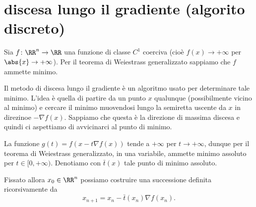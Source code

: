 \section{discesa lungo il gradiente (algorito discreto)}

Sia $f\colon \RR^n\to \RR$ una funzione di classe $C^1$
coerciva (cioè $f(x)\to +\infty$ per $\abs{x}\to +\infty$).
Per il teorema di Weiestrass generalizzato sappiamo che 
$f$ ammette minimo.

Il metodo di discesa lungo il gradiente è un algoritmo
usato per determinare tale minimo. 
L'idea è quella di partire da un punto $x$ qualunque
(possibilmente vicino al minimo) e cercare il minimo
muovendosi lungo la semiretta uscente da $x$ in direzinoe 
$-\nabla f(x)$. 
Sappiamo che questa è la direzione di massima discesa 
e quindi ci aspettiamo di avvicinarci al punto di minimo.

La funzione $g(t) = f(x-t\nabla f(x))$
tende a $+\infty$ per $t\to +\infty$, 
dunque per il teorema di Weiestrass generalizzato, 
in una variabile, ammette minimo assoluto 
per $t\in [0,+\infty)$. 
Denotiamo con $\bar t(x)$ tale punto di minimo assoluto.

Fissato allora $x_0\in \RR^n$ possiamo costruire 
una successione definita ricorsivamente da
\begin{equation}\label{eq:discesa_discreta}
  x_{n+1} = x_n - \bar t(x_n) \nabla f(x_n). 
\end{equation}


